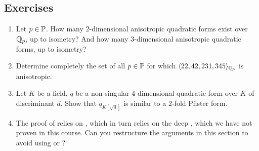 \documentclass[12pt, leqno, british]{amsart}
\begin{document}
\subsection{Exercises}
\begin{enumerate}
\item Let $p \in \mathbb P$.
How many $2$-dimensional anisotropic quadratic forms exist over $\mathbb Q_p$, up to isometry?
And how many $3$-dimensional anisotropic quadratic forms, up to isometry?
\item Determine completely the set of all $p \in \mathbb P$ for which $\langle 22, 42, 231, 345 \rangle_{\mathbb Q_p}$ is anisotropic.
\item Let $K$ be a field, $q$ be a non-singular $4$-dimensional quadratic form over $K$ of discriminant $d$.
Show that $q_{K[\sqrt{d}]}$ is similar to a $2$-fold Pfister form.
\item The proof of  relies on , which in turn relies on the deep , which we have not proven in this course.
Can you restructure the arguments in this section to avoid using  or ?
\end{enumerate}
\end{document}
